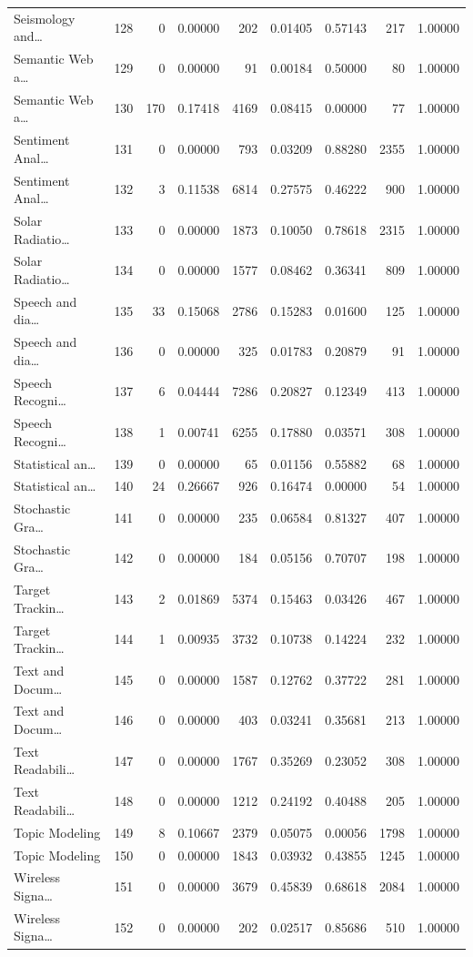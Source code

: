 \begin{table}
\begin{tabular}{lrrrrrrrr}
Seismology and… & 128 & 0 & 0.00000 & 202 & 0.01405 & 0.57143 & 217 & 1.00000 \\
Semantic Web a… & 129 & 0 & 0.00000 & 91 & 0.00184 & 0.50000 & 80 & 1.00000 \\
Semantic Web a… & 130 & 170 & 0.17418 & 4169 & 0.08415 & 0.00000 & 77 & 1.00000 \\
Sentiment Anal… & 131 & 0 & 0.00000 & 793 & 0.03209 & 0.88280 & 2355 & 1.00000 \\
Sentiment Anal… & 132 & 3 & 0.11538 & 6814 & 0.27575 & 0.46222 & 900 & 1.00000 \\
Solar Radiatio… & 133 & 0 & 0.00000 & 1873 & 0.10050 & 0.78618 & 2315 & 1.00000 \\
Solar Radiatio… & 134 & 0 & 0.00000 & 1577 & 0.08462 & 0.36341 & 809 & 1.00000 \\
Speech and dia… & 135 & 33 & 0.15068 & 2786 & 0.15283 & 0.01600 & 125 & 1.00000 \\
Speech and dia… & 136 & 0 & 0.00000 & 325 & 0.01783 & 0.20879 & 91 & 1.00000 \\
Speech Recogni… & 137 & 6 & 0.04444 & 7286 & 0.20827 & 0.12349 & 413 & 1.00000 \\
Speech Recogni… & 138 & 1 & 0.00741 & 6255 & 0.17880 & 0.03571 & 308 & 1.00000 \\
Statistical an… & 139 & 0 & 0.00000 & 65 & 0.01156 & 0.55882 & 68 & 1.00000 \\
Statistical an… & 140 & 24 & 0.26667 & 926 & 0.16474 & 0.00000 & 54 & 1.00000 \\
Stochastic Gra… & 141 & 0 & 0.00000 & 235 & 0.06584 & 0.81327 & 407 & 1.00000 \\
Stochastic Gra… & 142 & 0 & 0.00000 & 184 & 0.05156 & 0.70707 & 198 & 1.00000 \\
Target Trackin… & 143 & 2 & 0.01869 & 5374 & 0.15463 & 0.03426 & 467 & 1.00000 \\
Target Trackin… & 144 & 1 & 0.00935 & 3732 & 0.10738 & 0.14224 & 232 & 1.00000 \\
Text and Docum… & 145 & 0 & 0.00000 & 1587 & 0.12762 & 0.37722 & 281 & 1.00000 \\
Text and Docum… & 146 & 0 & 0.00000 & 403 & 0.03241 & 0.35681 & 213 & 1.00000 \\
Text Readabili… & 147 & 0 & 0.00000 & 1767 & 0.35269 & 0.23052 & 308 & 1.00000 \\
Text Readabili… & 148 & 0 & 0.00000 & 1212 & 0.24192 & 0.40488 & 205 & 1.00000 \\
Topic Modeling & 149 & 8 & 0.10667 & 2379 & 0.05075 & 0.00056 & 1798 & 1.00000 \\
Topic Modeling & 150 & 0 & 0.00000 & 1843 & 0.03932 & 0.43855 & 1245 & 1.00000 \\
Wireless Signa… & 151 & 0 & 0.00000 & 3679 & 0.45839 & 0.68618 & 2084 & 1.00000 \\
Wireless Signa… & 152 & 0 & 0.00000 & 202 & 0.02517 & 0.85686 & 510 & 1.00000 \\
\bottomrule
\end{tabular}
\end{table}

